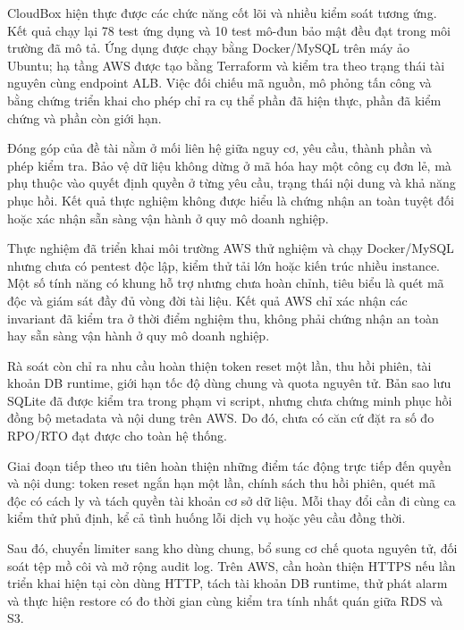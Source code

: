 CloudBox hiện thực được các chức năng cốt lõi và nhiều kiểm soát tương ứng. Kết quả chạy lại 78 test ứng dụng và 10 test mô-đun bảo mật đều đạt trong môi trường đã mô tả. Ứng dụng được chạy bằng Docker/MySQL trên máy ảo Ubuntu; hạ tầng AWS được tạo bằng Terraform và kiểm tra theo trạng thái tài nguyên cùng endpoint ALB. Việc đối chiếu mã nguồn, mô phỏng tấn công và bằng chứng triển khai cho phép chỉ ra cụ thể phần đã hiện thực, phần đã kiểm chứng và phần còn giới hạn.

Đóng góp của đề tài nằm ở mối liên hệ giữa nguy cơ, yêu cầu, thành phần và phép kiểm tra. Bảo vệ dữ liệu không dừng ở mã hóa hay một công cụ đơn lẻ, mà phụ thuộc vào quyết định quyền ở từng yêu cầu, trạng thái nội dung và khả năng phục hồi. Kết quả thực nghiệm không được hiểu là chứng nhận an toàn tuyệt đối hoặc xác nhận sẵn sàng vận hành ở quy mô doanh nghiệp.

Thực nghiệm đã triển khai môi trường AWS thử nghiệm và chạy Docker/MySQL nhưng chưa có pentest độc lập, kiểm thử tải lớn hoặc kiến trúc nhiều instance. Một số tính năng có khung hỗ trợ nhưng chưa hoàn chỉnh, tiêu biểu là quét mã độc và giám sát đầy đủ vòng đời tài liệu. Kết quả AWS chỉ xác nhận các invariant đã kiểm tra ở thời điểm nghiệm thu, không phải chứng nhận an toàn hay sẵn sàng vận hành ở quy mô doanh nghiệp.

Rà soát còn chỉ ra nhu cầu hoàn thiện token reset một lần, thu hồi phiên, tài khoản DB runtime, giới hạn tốc độ dùng chung và quota nguyên tử. Bản sao lưu SQLite đã được kiểm tra trong phạm vi script, nhưng chưa chứng minh phục hồi đồng bộ metadata và nội dung trên AWS. Do đó, chưa có căn cứ đặt ra số đo RPO/RTO đạt được cho toàn hệ thống.

Giai đoạn tiếp theo ưu tiên hoàn thiện những điểm tác động trực tiếp đến quyền và nội dung: token reset ngắn hạn một lần, chính sách thu hồi phiên, quét mã độc có cách ly và tách quyền tài khoản cơ sở dữ liệu. Mỗi thay đổi cần đi cùng ca kiểm thử phủ định, kể cả tình huống lỗi dịch vụ hoặc yêu cầu đồng thời.

Sau đó, chuyển limiter sang kho dùng chung, bổ sung cơ chế quota nguyên tử, đối soát tệp mồ côi và mở rộng audit log. Trên AWS, cần hoàn thiện HTTPS nếu lần triển khai hiện tại còn dùng HTTP, tách tài khoản DB runtime, thử phát alarm và thực hiện restore có đo thời gian cùng kiểm tra tính nhất quán giữa RDS và S3.

